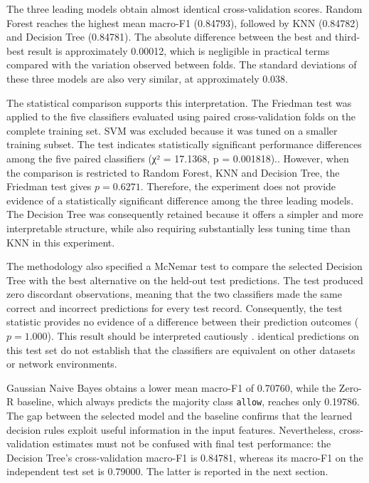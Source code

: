 The three leading models obtain almost identical cross-validation scores. Random Forest reaches the highest mean macro-F1 (0.84793), followed by KNN (0.84782) and Decision Tree (0.84781). The absolute difference between the best and third-best result is approximately 0.00012, which is negligible in practical terms compared with the variation observed between folds. The standard deviations of these three models are also very similar, at approximately 0.038.

The statistical comparison supports this interpretation. The Friedman test was applied to the five classifiers evaluated using paired cross-validation folds on the complete training set. SVM was excluded because it was tuned on a smaller training subset. The test indicates statistically significant performance differences among the five paired classifiers (χ² = 17.1368, p = 0.001818).. However, when the comparison is restricted to Random Forest, KNN and Decision Tree, the Friedman test gives $p=0.6271$. Therefore, the experiment does not provide evidence of a statistically significant difference among the three leading models. The Decision Tree was consequently retained because it offers a simpler and more interpretable structure, while also requiring substantially less tuning time than KNN in this experiment.

The methodology also specified a McNemar test to compare the selected Decision Tree with the best alternative on the held-out test predictions. The test produced zero discordant observations, meaning that the two classifiers made the same correct and incorrect predictions for every test record. Consequently, the test statistic provides no evidence of a difference between their prediction outcomes ($p=1.000$). This result should be interpreted cautiously . identical predictions on this test set do not establish that the classifiers are equivalent on other datasets or network environments.


Gaussian Naive Bayes obtains a lower mean macro-F1 of 0.70760, while the Zero-R baseline, which always predicts the majority class \texttt{allow}, reaches only 0.19786. The gap between the selected model and the baseline confirms that the learned decision rules exploit useful information in the input features. Nevertheless, cross-validation estimates must not be confused with final test performance: the Decision Tree's cross-validation macro-F1 is 0.84781, whereas its macro-F1 on the independent test set is 0.79000. The latter is reported in the next section.

